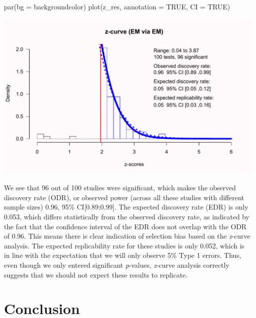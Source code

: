 \documentclass[
  oneside]{book}
\newenvironment{Shaded}{\begin{snugshade}}{\end{snugshade}}
\newcommand{\AttributeTok}[1]{\textcolor[rgb]{0.77,0.63,0.00}{#1}}
\newcommand{\ConstantTok}[1]{\textcolor[rgb]{0.00,0.00,0.00}{#1}}
\newcommand{\FunctionTok}[1]{\textcolor[rgb]{0.00,0.00,0.00}{#1}}
\newcommand{\NormalTok}[1]{#1}
\begin{document}
\begin{Shaded}
\begin{Highlighting}[]
\FunctionTok{par}\NormalTok{(}\AttributeTok{bg =}\NormalTok{ backgroundcolor)}
\FunctionTok{plot}\NormalTok{(z\_res, }\AttributeTok{annotation =} \ConstantTok{TRUE}\NormalTok{, }\AttributeTok{CI =} \ConstantTok{TRUE}\NormalTok{)}
\end{Highlighting}
\end{Shaded}

\begin{center}\includegraphics[width=1\linewidth]{12-bias_files/figure-latex/unnamed-chunk-3-1} \end{center}

We see that 96 out of 100 studies were significant, which makes the observed discovery rate (ODR), or observed power (across all these studies with different sample sizes) 0.96, 95\% CI{[}0.89;0.99{]}. The expected discovery rate (EDR) is only 0.053, which differs statistically from the observed discovery rate, as indicated by the fact that the confidence interval of the EDR does not overlap with the ODR of 0.96. This means there is clear indication of selection bias based on the \emph{z}-curve analysis. The expected replicability rate for these studies is only 0.052, which is in line with the expectation that we will only observe 5\% Type 1 errors. Thus, even though we only entered significant \emph{p}-values, \emph{z}-curve analysis correctly suggests that we should not expect these results to replicate.

\hypertarget{conclusion}{%
\section{Conclusion}\label{conclusion}}
\end{document}
